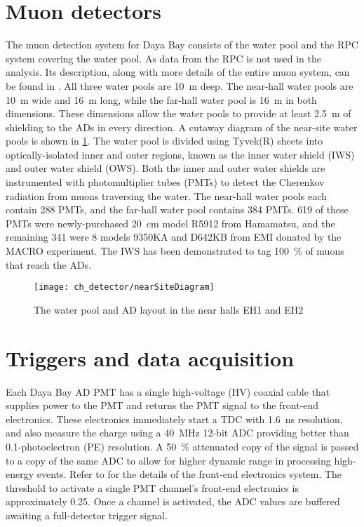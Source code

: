 \section{Muon detectors}

The muon detection system for Daya Bay consists of
the water pool and the RPC system covering the water pool.
As data from the RPC is not used in the \thetaot{} analysis.
Its description, along with more details of the entire muon system,
can be found in \cite{muonsystem2015}.
All three water pools are \SI{10}{\m} deep.
The near-hall water pools are \SI{10}{\m} wide and \SI{16}{\m} long,
while the far-hall water pool is \SI{16}{\m} in both dimensions.
These dimensions allow the water pools to provide at least \SI{2.5}{\m} of shielding
to the ADs in every direction.
A cutaway diagram of the near-site water pools is shown in \cref{fig:wpcutout}.
The water pool is divided using Tyvek(R) sheets
into optically-isolated inner and outer regions,
known as the inner water shield (IWS) and outer water shield (OWS).
Both the inner and outer water shields are instrumented with photomultiplier tubes (PMTs)
to detect the Cherenkov radiation from muons traversing the water.
The near-hall water pools each contain \num{288} PMTs,
and the far-hall water pool contains \num{384} PMTs.
\num{619} of these PMTs were newly-purchased \SI{20}{\cm}
model R5912 from Hamamatsu,
and the remaining \num{341} were \SI{8}{\inch} models 9350KA
and D642KB from EMI
donated by the MACRO experiment.
The IWS has been demonstrated to tag \SI{100}{\percent} of muons
that reach the ADs.

\begin{figure}
    \centering
    \texttt{[image: ch\_detector/nearSiteDiagram]}
    \caption{The water pool and AD layout in the near halls EH1 and EH2}
    \label{fig:wpcutout}
\end{figure}



\section{Triggers and data acquisition}

Each Daya Bay AD PMT has a single high-voltage (HV) coaxial cable
that supplies power to the PMT and returns the PMT signal to the
front-end electronics.
These electronics immediately start a TDC with \SI{1.6}{\ns} resolution,
and also measure the charge using a \SI{40}{\MHz} \num{12}-bit ADC
providing better than \num{0.1}-photoelectron (PE) resolution.
A \SI{50}{\percent} attenuated copy of the signal is passed to a copy
of the same ADC to allow for higher dynamic range in processing high-energy
events.
Refer to \cite[Sec.~II]{ngd2016} for the details
of the front-end electronics system.
The threshold to activate a single PMT channel's front-end electronics
is approximately \SI{0.25}{\pe}.
Once a channel is activated, the ADC values are buffered
awaiting a full-detector trigger signal.

